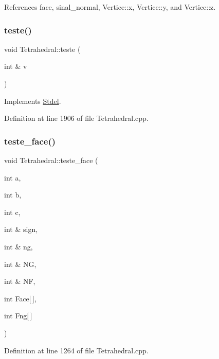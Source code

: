 References face, sinal\+\_\+normal, Vertice\+::x, Vertice\+::y, and Vertice\+::z.

\mbox{\label{classTetrahedral_acf22ee55ae8a5f17467b1dc4c6da3b51}} 
\subsubsection{\texorpdfstring{teste()}{teste()}}
{\footnotesize\ttfamily void Tetrahedral\+::teste (\begin{DoxyParamCaption}\item[{int \&}]{v }\end{DoxyParamCaption})\hspace{0.3cm}{\ttfamily [virtual]}}



Implements \hyperlink{classStdel_ae62bc70bb31e48d165593ed1ecd482f8}{Stdel}.



Definition at line 1906 of file Tetrahedral.\+cpp.

\mbox{\label{classTetrahedral_a490b36fd79d587ca945795fb53b6142b}} 
\subsubsection{\texorpdfstring{teste\+\_\+face()}{teste\_face()}}
{\footnotesize\ttfamily void Tetrahedral\+::teste\+\_\+face (\begin{DoxyParamCaption}\item[{int}]{a,  }\item[{int}]{b,  }\item[{int}]{c,  }\item[{int \&}]{sign,  }\item[{int \&}]{ng,  }\item[{int \&}]{NG,  }\item[{int \&}]{NF,  }\item[{int}]{Face\mbox{[}$\,$\mbox{]},  }\item[{int}]{Fng\mbox{[}$\,$\mbox{]} }\end{DoxyParamCaption})}



Definition at line 1264 of file Tetrahedral.\+cpp.



